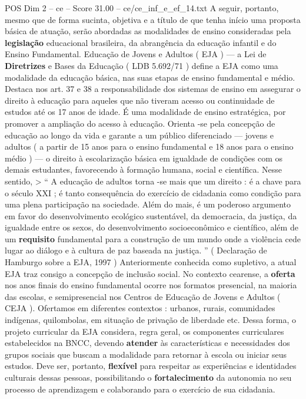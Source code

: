 \begin{textsample}{POS Dim 2 – ce – Score 31.00 – ce/ce\_inf\_e\_ef\_14.txt}
A seguir, portanto, mesmo que de forma sucinta, objetiva e a título de que tenha início uma proposta básica de atuação, serão abordadas as modalidades de ensino consideradas pela \textbf{legislação} educacional brasileira, da abrangência da educação infantil e do Ensino Fundamental.
Educação de Jovens e Adultos ( EJA ) — a Lei de \textbf{Diretrizes} e Bases da Educação ( LDB 5.692/71 ) define a EJA como uma modalidade da educação básica, nas suas etapas de ensino fundamental e médio.
Destaca nos art. 37 e 38 a responsabilidade dos sistemas de ensino em assegurar o direito à educação para aqueles que não tiveram acesso ou continuidade de estudos até os 17 anos de idade.
É uma modalidade de ensino estratégica, por promover a ampliação do acesso à educação.
Orienta -se pela concepção de educação ao longo da vida e garante a um público diferenciado — jovens e adultos ( a partir de 15 anos para o ensino fundamental e 18 anos para o ensino médio ) — o direito à escolarização básica em igualdade de condições com os demais estudantes, favorecendo à formação humana, social e científica.
Nesse sentido, > “ A educação de adultos torna -se mais que um direito : é a chave para o século XXI ; é tanto consequência do exercício de cidadania como condição para uma plena participação na sociedade.
Além do mais, é um poderoso argumento em favor do desenvolvimento ecológico sustentável, da democracia, da justiça, da igualdade entre os sexos, do desenvolvimento socioeconômico e científico, além de um \textbf{requisito} fundamental para a construção de um mundo onde a violência cede lugar ao diálogo e à cultura de paz baseada na justiça. ” ( Declaração de Hamburgo sobre a EJA, 1997 ) Anteriormente conhecida como supletivo, a atual EJA traz consigo a concepção de inclusão social.
No contexto cearense, a \textbf{oferta} nos anos finais do ensino fundamental ocorre nos formatos presencial, na maioria das escolas, e semipresencial nos Centros de Educação de Jovens e Adultos ( CEJA ).
Ofertamos em diferentes contextos : urbanos, rurais, comunidades indígenas, quilombolas, em situação de privação de liberdade etc.
Dessa forma, o projeto curricular da EJA considera, regra geral, os componentes curriculares estabelecidos na BNCC, devendo \textbf{atender} às características e necessidades dos grupos sociais que buscam a modalidade para retornar à escola ou iniciar seus estudos.
Deve ser, portanto, \textbf{flexível} para respeitar as experiências e identidades culturais dessas pessoas, possibilitando o \textbf{fortalecimento} da autonomia no seu processo de aprendizagem e colaborando para o exercício de sua cidadania.

\end{textsample}
